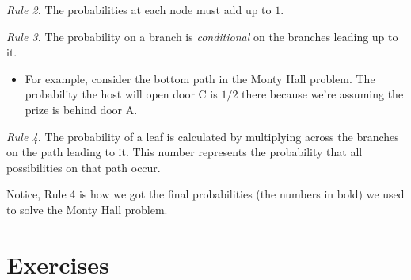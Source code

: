 \documentclass[justified]{tufte-book}
\providecommand{\tightlist}{%
  \setlength{\itemsep}{0pt}\setlength{\parskip}{0pt}}
\theoremstyle{definition}
\theoremstyle{definition}
\theoremstyle{definition}
\theoremstyle{remark}
\begin{document}
\emph{Rule 2.} The probabilities at each node must add up to \(1\).

\emph{Rule 3.} The probability on a branch is \emph{conditional} on the
branches leading up to it.

\begin{itemize}
\tightlist
\item
  For example, consider the bottom path in the Monty Hall problem. The
  probability the host will open door C is \(1/2\) there because we're
  assuming the prize is behind door A.
\end{itemize}

\emph{Rule 4.} The probability of a leaf is calculated by multiplying
across the branches on the path leading to it. This number represents
the probability that all possibilities on that path occur.

Notice, Rule 4 is how we got the final probabilities (the numbers in
bold) we used to solve the Monty Hall problem.

\hypertarget{exercises}{%
\section*{Exercises}\label{exercises}}
\end{document}
